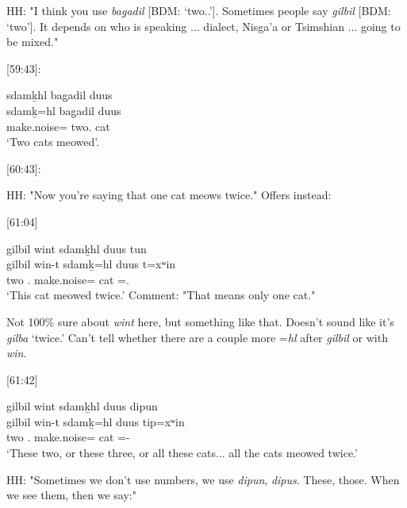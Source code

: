 HH: "I think you use \textit{bag̱adil} [BDM: `two.\Hum{}.']. Sometimes people say \textit{gilbil} [BDM: `two']. It depends on who is speaking ... dialect, Nisga'a or Tsimshian ... going to be mixed." 

[59:43]:
\begin{exe}
    \ex \glll
    sdamḵhl bag̱adil duus \\
    sdamḵ=hl bag̱adil duus \\
    make.noise=\Cn{} two.\Hum{} cat \\
    \glt `Two cats meowed'.
\end{exe}

[60:43]: 
\begin{exe}
\end{exe}

HH: "Now you're saying that one cat meows twice." Offers instead:

[61:04]
 \begin{exe}
    \ex \glll
    gilbil wint sdamḵhl duus tun \\
    gilbil win-t sdamḵ=hl  duus t=xʷin \\
     two .\I{}  make.noise=\Cn{} cat \Pn=\Dem.\Prox \\
    \glt `This cat meowed twice.' Comment: "That means only one cat."
\end{exe}

Not 100\% sure about \textit{wint} here, but something like that. Doesn't sound like it's \textit{gilba} `twice.' Can't tell whether there are a couple more =\textit{hl} after \textit{gilbil} or with \textit{win}.

[61:42]
 \begin{exe}
    \ex \glll
    gilbil wint sdamḵhl duus dipun \\
    gilbil win-t sdamḵ=hl  duus tip=xʷin \\
    two .\I{}  make.noise=\Cn{} cat \Pn=\Dem-\Prox \\
    \glt `These two, or these three, or all these cats... all the cats meowed twice.' 
\end{exe}

HH: "Sometimes we don't use numbers, we use \textit{dipun}, \textit{dipus}. These, those. When we see them, then we say:"

